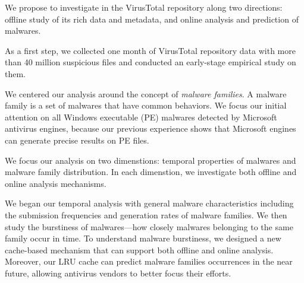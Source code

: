 We propose to investigate in the VirusTotal repository along two directions:
offline study of its rich data and metadata, 
and online analysis and prediction of malwares.

As a first step, we collected one month of VirusTotal repository data with more than 40 million suspicious files
and conducted an early-stage empirical study on them. 

We centered our analysis around the concept of {\em malware families}.
A malware family is a set of malwares that have common behaviors.
We focus our initial attention on all Windows executable (PE) malwares detected by Microsoft
antivirus engines, 
because our previous experience shows that Microsoft engines can generate precise results on PE files.

We focus our analysis on two dimenstions: temporal properties of malwares and 
malware family distribution.
In each dimenstion, we investigate both offline and online analysis mechanisms.

We began our temporal analysis with general malware characteristics including the submission
frequencies and generation rates of malware families. 
We then study the burstiness of malwares---how closely malwares belonging to the same family occur in time. 
To understand malware burstiness, we designed a new cache-based mechanism 
that can support both offline and online analysis.
Moreover, our LRU cache can predict malware families occurrences in the near future, 
allowing antivirus vendors to better focus their efforts. 

